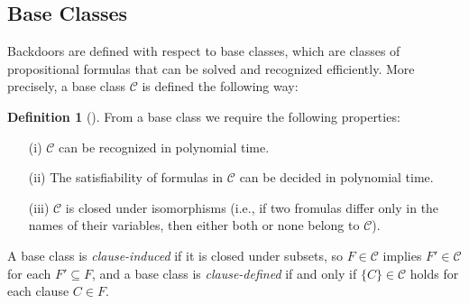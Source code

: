 \documentclass[11pt,a4paper]{article}
\theoremstyle{definition}
\newtheorem{definition}{Definition}[section]
\theoremstyle{proposition}
\begin{document}
\subsection{Base Classes}
Backdoors are defined with respect to base classes, which are classes of propositional formulas that can be solved and recognized efficiently. More precisely, a base class $\mathcal{C}$ is defined the following way:
\begin{definition}[{\cite[p.289]{Gaspers2012}}]
\label{def:baseclass}
From a base class we require the following properties: 
\begin{itemize}
\item[(i)] $\mathcal{C}$ can be recognized in polynomial time.
\item[(ii)] The satisfiability of formulas in $\mathcal{C}$ can be decided in polynomial time.
\item[(iii)] $\mathcal{C}$ is closed under isomorphisms (i.e., if two fromulas differ only in the names of their variables, then either both or none belong to $\mathcal{C}$). 
\end{itemize}
\end{definition}
A base class is \textit{clause-induced} if it is closed under subsets, so $F \in \mathcal{C}$ implies $F' \in \mathcal{C}$ for each $F' \subseteq F$, and a base class is \textit{clause-defined} if and only if $\{C\} \in \mathcal{C}$ holds for each clause $C \in F$.
 
\end{document}
